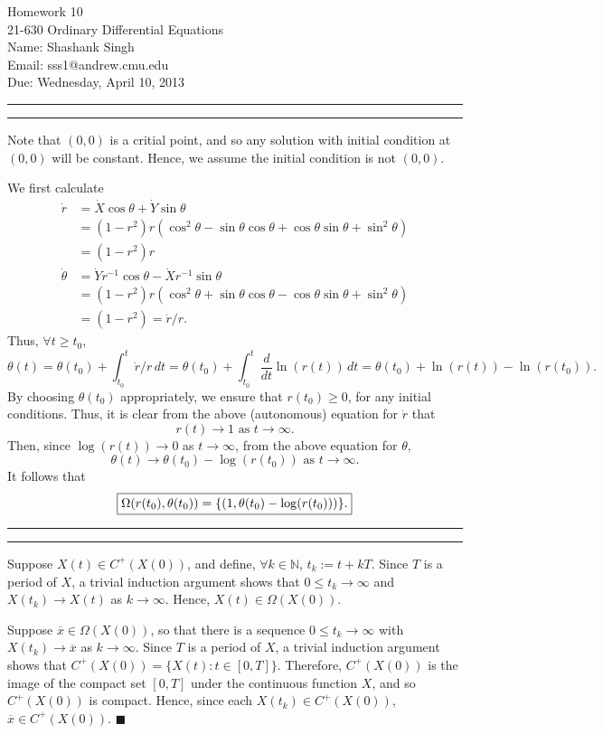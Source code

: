 \documentclass[11pt]{article}
\makeatletter
\newcounter{questionCounter}
\newcounter{partCounter}[questionCounter]
\newenvironment{question}[2][\arabic{questionCounter}]{%
    \setcounter{partCounter}{0}%
    \vspace{.25in} \hrule \vspace{0.5em}%
        \noindent{\bf #2}%
    \vspace{0.8em} \hrule \vspace{.10in}%
    \addtocounter{questionCounter}{1}%
}{}
\newcommand{\myname}{Shashank Singh}
\newcommand{\myandrew}{sss1@andrew.cmu.edu}
\newcommand{\myclass}{21-630 Ordinary Differential Equations}
\newcommand{\myhwnum}{10}
\newcommand{\duedate}{Wednesday, April 10, 2013}
\renewcommand{\qed}{\quad $\blacksquare$}
\newcommand{\inv}{^{-1}}
\newcommand{\N}{\mathbb{N}} %
\newcommand{\ol}{\overline}
\makeatother
\begin{document}
\thispagestyle{plain}

{\Large Homework \myhwnum} \\
\myclass            \\
Name: \myname       \\
Email: \myandrew    \\
Due: \duedate

\begin{question}{Problem 1}
Note that $(0,0)$ is a critial point, and so any solution with initial
condition at $(0,0)$ will be constant. Hence, we assume the initial condition
is not $(0,0)$.

We first calculate
\begin{align*}
\dot r
    & = \dot X \cos \theta + \dot Y \sin \theta \\
    & = (1 - r^2) r (\cos^2 \theta - \sin \theta \cos \theta
        + \cos \theta \sin \theta + \sin^2 \theta) \\
    & = (1 - r^2) r \\
\dot \theta
    & = \dot Y r\inv \cos \theta - \dot X r\inv \sin \theta \\
    & = (1 - r^2) r (\cos^2 \theta + \sin \theta \cos \theta
        - \cos \theta \sin \theta + \sin^2 \theta) \\
    & = (1 - r^2) = \dot r / r.
\end{align*}
Thus, $\forall t \geq t_0$,
\[\theta(t)
    = \theta(t_0) + \int_{t_0}^t \dot r / r \, dt
    = \theta(t_0) + \int_{t_0}^t \frac{d}{dt} \ln(r(t)) \, dt
    = \theta(t_0) + \ln(r(t)) - \ln(r(t_0)).
\]
By choosing $\theta(t_0)$ appropriately, we ensure that $r(t_0) \geq 0$, for
any initial conditions. Thus, it is clear from the above (autonomous) equation
for $\dot r$ that \[r(t) \rightarrow 1 \mbox{ as } t \rightarrow \infty.\] Then,
since $\log(r(t)) \rightarrow 0$ as $t \rightarrow \infty$, from the above
equation for $\theta$,
\[\theta(t) \rightarrow \theta(t_0) - \log(r(t_0)) \mbox{ as }
    t \rightarrow \infty.\]
It follows that
\[\mbox{\fbox{$\displaystyle
    \Omega(r(t_0),\theta(t_0))
    = \{(1,\theta(t_0) - \log(r(t_0)))\}
$.}}\]
\end{question}

\newpage
\begin{question}{Problem 2}
Suppose $X(t) \in C^+(X(0))$, and define, $\forall k \in \N$, $t_k := t + kT$.
Since $T$ is a period of $X$, a trivial induction argument shows that
$0 \leq t_k \rightarrow \infty$ and $X(t_k) \rightarrow X(t)$ as
$k \rightarrow \infty$. Hence, $X(t) \in \Omega(X(0))$.

Suppose $\ol x \in \Omega(X(0))$, so that there is a sequence
$0 \leq t_k \rightarrow \infty$ with $X(t_k) \rightarrow \ol x$ as
$k \rightarrow \infty$. Since $T$ is a period of $X$, a trivial induction
argument shows that $C^+(X(0)) = \{X(t) : t \in [0,T]\}$. Therefore,
$C^+(X(0))$ is the image of the compact set $[0,T]$ under the continuous
function $X$, and so $C^+(X(0))$ is compact. Hence, since each
$X(t_k) \in C^+(X(0))$, $\ol x \in C^+(X(0))$. \qed
\end{question}
\end{document}
